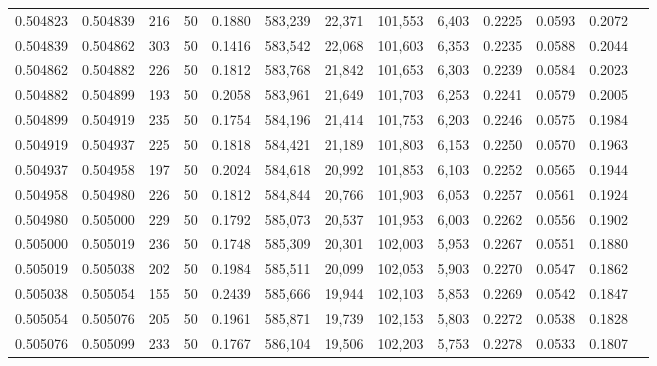 \begin{tabular}{rrrrrrrrrrrrr}
0.504823 & 0.504839 & 216 &  50 &                                     0.1880 & 583,239 &  22,371 & 101,553 &   6,403 & 0.2225 & 0.0593 & 0.2072 \\
0.504839 & 0.504862 & 303 &  50 &                                     0.1416 & 583,542 &  22,068 & 101,603 &   6,353 & 0.2235 & 0.0588 & 0.2044 \\
0.504862 & 0.504882 & 226 &  50 &                                     0.1812 & 583,768 &  21,842 & 101,653 &   6,303 & 0.2239 & 0.0584 & 0.2023 \\
0.504882 & 0.504899 & 193 &  50 &                                     0.2058 & 583,961 &  21,649 & 101,703 &   6,253 & 0.2241 & 0.0579 & 0.2005 \\
0.504899 & 0.504919 & 235 &  50 &                                     0.1754 & 584,196 &  21,414 & 101,753 &   6,203 & 0.2246 & 0.0575 & 0.1984 \\
0.504919 & 0.504937 & 225 &  50 &                                     0.1818 & 584,421 &  21,189 & 101,803 &   6,153 & 0.2250 & 0.0570 & 0.1963 \\
0.504937 & 0.504958 & 197 &  50 &                                     0.2024 & 584,618 &  20,992 & 101,853 &   6,103 & 0.2252 & 0.0565 & 0.1944 \\
0.504958 & 0.504980 & 226 &  50 &                                     0.1812 & 584,844 &  20,766 & 101,903 &   6,053 & 0.2257 & 0.0561 & 0.1924 \\
0.504980 & 0.505000 & 229 &  50 &                                     0.1792 & 585,073 &  20,537 & 101,953 &   6,003 & 0.2262 & 0.0556 & 0.1902 \\
0.505000 & 0.505019 & 236 &  50 &                                     0.1748 & 585,309 &  20,301 & 102,003 &   5,953 & 0.2267 & 0.0551 & 0.1880 \\
0.505019 & 0.505038 & 202 &  50 &                                     0.1984 & 585,511 &  20,099 & 102,053 &   5,903 & 0.2270 & 0.0547 & 0.1862 \\
0.505038 & 0.505054 & 155 &  50 &                                     0.2439 & 585,666 &  19,944 & 102,103 &   5,853 & 0.2269 & 0.0542 & 0.1847 \\
0.505054 & 0.505076 & 205 &  50 &                                     0.1961 & 585,871 &  19,739 & 102,153 &   5,803 & 0.2272 & 0.0538 & 0.1828 \\
0.505076 & 0.505099 & 233 &  50 &                                     0.1767 & 586,104 &  19,506 & 102,203 &   5,753 & 0.2278 & 0.0533 & 0.1807 \\

\end{tabular}
